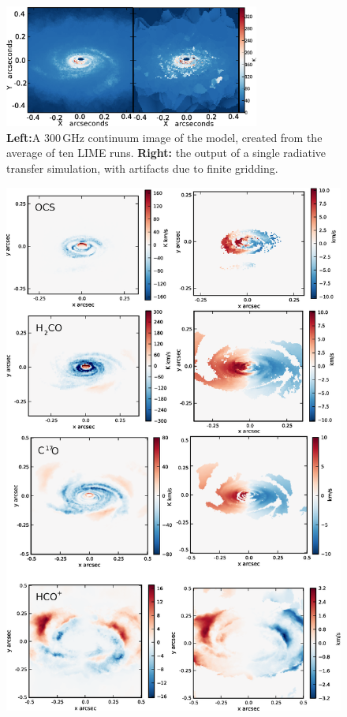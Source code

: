 \documentclass[useAMS,usenatbib]{mn2e}
\begin{document}
\begin{figure}
 \includegraphics[width=84mm]{Figures/sim/continuum.eps}
 \caption{{\bf Left:}A 300$\,$GHz continuum image of the model, created from the average of ten LIME runs. {\bf Right:} the output of a single radiative transfer simulation, with artifacts due to finite gridding.}
 \label{averages}
\end{figure}

\begin{figure}
 \includegraphics[width=150mm]{Figures/sim/imageALL_30deg_all.eps}

\end{figure}
\end{document}
